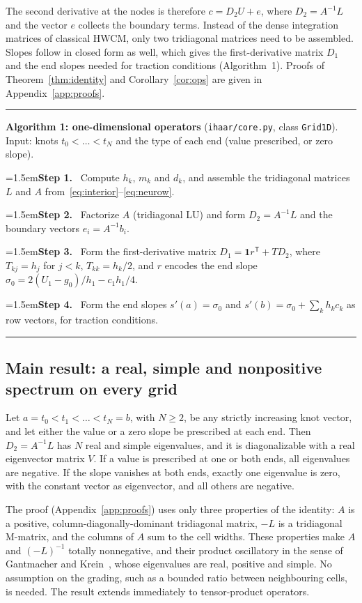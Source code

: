 \documentclass[smallextended,envcountsame]{svjour3}
\newcommand{\step}[1]{\par\noindent\hangindent=1.5em\hangafter=1\textbf{Step #1.}\ }
\begin{document}
The second derivative at the nodes is therefore $c=D_2U+e$, where $D_2=A^{-1}L$ and the vector $e$ collects the boundary terms.
Instead of the dense integration matrices of classical HWCM, only two tridiagonal matrices need to be
assembled. Slopes follow in closed form as well, which gives the first-derivative matrix $D_1$ and the
end slopes needed for traction conditions (Algorithm~1). Proofs of Theorem~\ref{thm:identity} and
Corollary~\ref{cor:ops} are given in Appendix~\ref{app:proofs}.

\begin{algorithm}[t]\small\hrule\smallskip
\noindent\textbf{Algorithm 1: one-dimensional operators} (\texttt{ihaar/core.py}, class \texttt{Grid1D}).
Input: knots $t_0<\dots<t_N$ and the type of each end (value prescribed, or zero slope).
\step{1} Compute $h_k$, $m_k$ and $d_k$, and assemble the tridiagonal matrices $L$ and $A$ from~\eqref{eq:interior}--\eqref{eq:neurow}.
\step{2} Factorize $A$ (tridiagonal LU) and form $D_2=A^{-1}L$ and the boundary vectors $e_i=A^{-1}b_i$.
\step{3} Form the first-derivative matrix $D_1=\mathbf 1r^{\mathsf T}+TD_2$, where $T_{kj}=h_j$ for $j<k$, $T_{kk}=h_k/2$, and $r$ encodes the end slope $\sigma_0=2(U_1-g_0)/h_1-c_1h_1/4$.
\step{4} Form the end slopes $s'(a)=\sigma_0$ and $s'(b)=\sigma_0+\sum_kh_kc_k$ as row vectors, for traction conditions.
\smallskip\hrule
\end{algorithm}

\subsection{Main result: a real, simple and nonpositive spectrum on every grid}
\begin{theorem}\label{thm:spectrum}
Let $a=t_0<t_1<\dots<t_N=b$, with $N\ge2$, be any strictly increasing knot vector, and let either the
value or a zero slope be prescribed at each end. Then $D_2=A^{-1}L$ has $N$ real and simple eigenvalues,
and it is diagonalizable with a real eigenvector matrix $V$. If a value is prescribed at one or both ends,
all eigenvalues are negative. If the slope vanishes at both ends, exactly one eigenvalue is zero, with the
constant vector as eigenvector, and all others are negative.
\end{theorem}

The proof (Appendix~\ref{app:proofs}) uses only three properties of the identity: $A$ is a positive,
column-diagonally-dominant tridiagonal matrix, $-L$ is a tridiagonal M-matrix, and the columns of $A$ sum
to the cell widths. These properties make $A$ and $(-L)^{-1}$ totally nonnegative, and their product
oscillatory in the sense of Gantmacher and Krein~\cite{gantmacher2002oscillation}, whose eigenvalues are
real, positive and simple. No assumption on the grading, such as a bounded ratio between neighbouring
cells, is needed. The result extends immediately to tensor-product operators.
\end{document}
